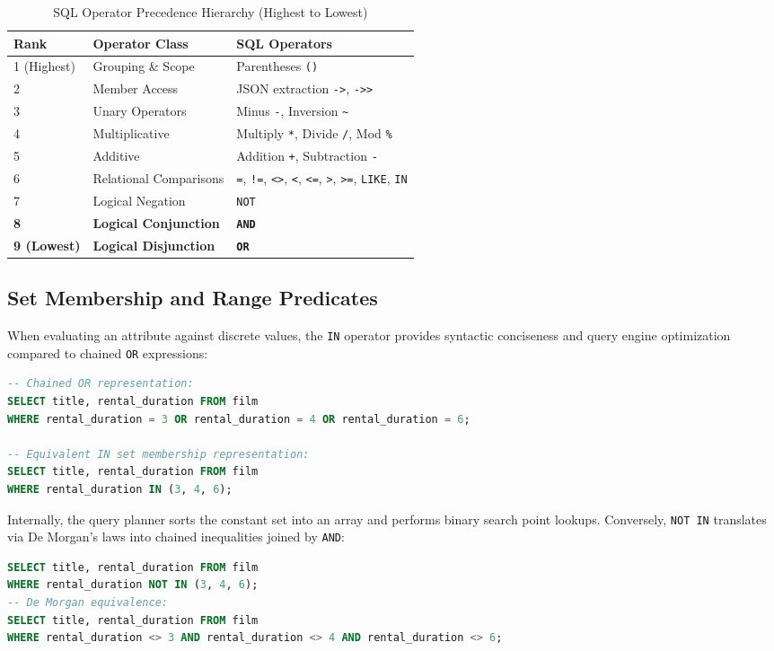 \documentclass[10pt,twocolumn,letterpaper]{article}
\begin{document}
\begin{table}[htbp]
\caption{SQL Operator Precedence Hierarchy (Highest to Lowest)}
\label{tab:precedence}
\centering
\scriptsize
\begin{tabular}{lp{2.5cm}p{3.2cm}}
\toprule
\textbf{Rank} & \textbf{Operator Class} & \textbf{SQL Operators} \\
\midrule
1 (Highest) & Grouping \& Scope & Parentheses \texttt{()} \\
2 & Member Access & JSON extraction \texttt{->}, \texttt{->>} \\
3 & Unary Operators & Minus \texttt{-}, Inversion \texttt{\~{}} \\
4 & Multiplicative & Multiply \texttt{*}, Divide \texttt{/}, Mod \texttt{\%} \\
5 & Additive & Addition \texttt{+}, Subtraction \texttt{-} \\
6 & Relational Comparisons & \texttt{=}, \texttt{!=}, \texttt{<>}, \texttt{<}, \texttt{<=}, \texttt{>}, \texttt{>=}, \texttt{LIKE}, \texttt{IN} \\
7 & Logical Negation & \texttt{NOT} \\
\textbf{8} & \textbf{Logical Conjunction} & \textbf{\texttt{AND}} \\
\textbf{9 (Lowest)} & \textbf{Logical Disjunction} & \textbf{\texttt{OR}} \\
\bottomrule
\end{tabular}
\end{table}

\subsection{Set Membership and Range Predicates}
When evaluating an attribute against discrete values, the \texttt{IN} operator provides syntactic conciseness and query engine optimization compared to chained \texttt{OR} expressions:
\begin{lstlisting}[language=SQL]
-- Chained OR representation:
SELECT title, rental_duration FROM film
WHERE rental_duration = 3 OR rental_duration = 4 OR rental_duration = 6;

-- Equivalent IN set membership representation:
SELECT title, rental_duration FROM film
WHERE rental_duration IN (3, 4, 6);
\end{lstlisting}
Internally, the query planner sorts the constant set into an array and performs binary search point lookups. Conversely, \texttt{NOT IN} translates via De Morgan's laws into chained inequalities joined by \texttt{AND}:
\begin{lstlisting}[language=SQL]
SELECT title, rental_duration FROM film 
WHERE rental_duration NOT IN (3, 4, 6);
-- De Morgan equivalence:
SELECT title, rental_duration FROM film 
WHERE rental_duration <> 3 AND rental_duration <> 4 AND rental_duration <> 6;
\end{lstlisting}
\end{document}
